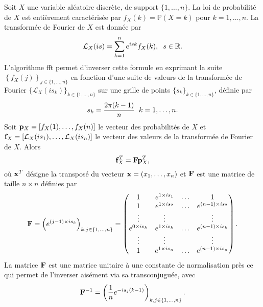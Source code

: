 Soit $X$ une variable aléatoire discrète, de support $\{1,\ldots,n\}$. La loi de probabilité de $X$ est entièrement caractérisée par $f_{X}(k)=\mathbb{P}(X=k)$ pour $k=1,\ldots,n$. La transformée de Fourier de $X$ est donnée par 
\begin{equation}\label{DiscreteFourierTransform}
\mathcal{L}_{X}(is)=\sum_{k=1}^{n}e^{isk}f_{X}(k),\hspace{0.2cm} s\in\mathbb{R}.
\end{equation}
L\rq{}algorithme \gls{fft} permet d\rq{}inverser cette formule en exprimant la suite $\left\{f_{X}(j)\right\}_{j\in\{1,\ldots,n\}}$ en fonction d\rq{}une suite de valeurs de la transformée de Fourier $\{\mathcal{L}_{X}(is_{k})\}_{k\in\{1,\ldots,n\}}$ sur une grille de points $\{s_{k}\}_{k\in\{1,\ldots,n\}}$, définie par
\begin{equation}\label{FFTDsicreteGrid}
s_{k}=\frac{2\pi (k-1)}{n}\hspace{0.2cm} k=1,\ldots,n. 
\end{equation}
Soit $\bold{p}_{X}=\left[f_{X}(1),\ldots,f_{X}(n)\right]$ le vecteur des probabilités de $X$ et $\bold{f}_{X}=\left[\mathcal{L}_{X}(is_{1}),\ldots,\mathcal{L}_{X}(is_{n})\right]$ le vecteur des valeurs de la transformée de Fourier de $X$. Alors 
\begin{equation}\label{MatrixLinkProbabilityFourierTransform}
\bold{f}_{X}^{T}=\bold{F}\bold{p}_{X}^{T},
\end{equation}
où $\bold{x}^{T}$ désigne la transposé du vecteur $\bold{x}=(x_{1},\ldots,x_{n})$ et $\bold{F}$ est une matrice de taille $n\times n$ définies par 
\begin{equation*}
\bold{F}=\left(e^{(j-1)\times is_{k}}\right)_{k,j\in\{1,\ldots,n\}}=\begin{pmatrix}
1&e^{1\times is_{1}}&\hdots&1\\
1&e^{1\times is_{2}}&\hdots&e^{(n-1)\times is_{2}}\\
\vdots&\vdots&&\vdots\\
e^{0\times is_{k}}&e^{1\times is_{k}}&\hdots&e^{(n-1)\times is_{k}}\\
\vdots&\vdots&&\vdots\\
1&e^{1\times is_{n}}&\hdots&e^{(n-1)\times is_{n}}\\
 \end{pmatrix}.
\end{equation*}
La matrice $\bold{F}$ est une matrice unitaire à une constante de normalisation près ce qui permet de l\rq{}inverser aisément via sa transconjuguée, avec
\begin{equation}\label{InverseF}
\bold{F}^{-1}=\left(\frac{1}{n}e^{-is_{j}(k-1)}\right)_{k,j\in\{1,\ldots,n\}}.
\end{equation}
